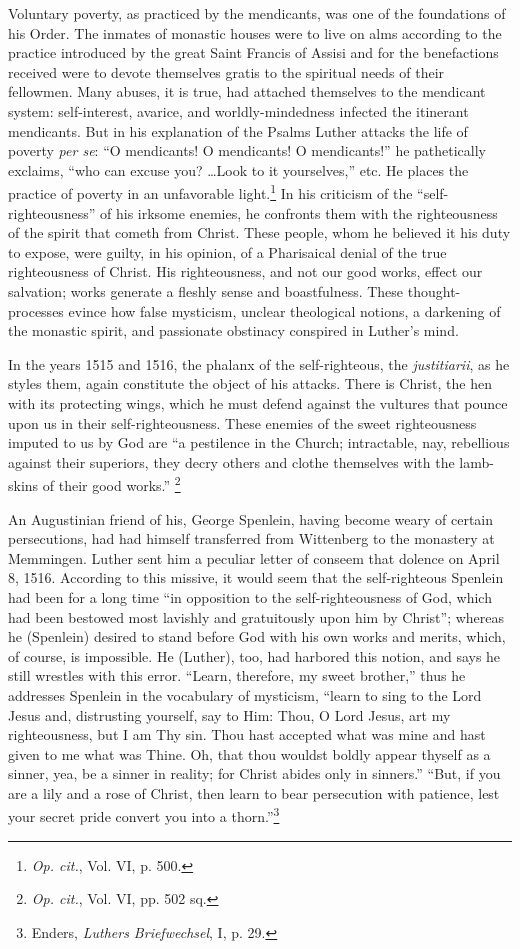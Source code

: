 Voluntary poverty, as practiced by the mendicants, was one of the
foundations of his Order. The inmates of monastic houses were to
live on alms according to the practice introduced by the great Saint
Francis of Assisi and for the benefactions received were to devote
themselves gratis to the spiritual needs of their fellowmen. Many
abuses, it is true, had attached themselves to the mendicant system:
self-interest, avarice, and worldly-mindedness infected the itinerant
mendicants. But in his explanation of the Psalms Luther attacks the
life of poverty \textit{per se}: “O mendicants! O mendicants! O mendicants!”
he pathetically exclaims, “who can excuse you? \dots Look to it
yourselves,” etc. He places the practice of poverty in an unfavorable
light.\footnote{\textit{Op. cit.}, Vol. VI, p. 500.}
In his criticism of the “self-righteousness” of his irksome
enemies, he confronts them with the righteousness of the spirit that
cometh from Christ. These people, whom he believed it his duty to
expose, were guilty, in his opinion, of a Pharisaical denial of the true
righteousness of Christ. His righteousness, and not our good works,
effect our salvation; works generate a fleshly sense and boastfulness.
These thought-processes evince how false mysticism, unclear theological
notions, a darkening of the monastic spirit, and passionate
obstinacy conspired in Luther’s mind.

In the years 1515 and 1516, the phalanx of the self-righteous, the \textit{justitiarii},
as he styles them, again constitute the object of his attacks. There
is Christ, the hen with its protecting wings, which he must defend against
the vultures that pounce upon us in their self-righteousness. These enemies
of the sweet righteousness imputed to us by God are “a pestilence in the
Church; intractable, nay, rebellious against their superiors, they decry others
and clothe themselves with the lamb-skins of their good works.”
\footnote{\textit{Op. cit.}, Vol. VI, pp. 502 sq.}

An Augustinian friend of his, George Spenlein, having become weary
of certain persecutions, had had himself transferred from Wittenberg to
the monastery at Memmingen. Luther sent him a peculiar letter of conseem that
dolence on April 8, 1516. According to this missive, it would seem that
the self-righteous Spenlein had been for a long time ``in opposition to the
self-righteousness of God, which had been bestowed most lavishly and
gratuitously upon him by Christ''; whereas he (Spenlein) desired to stand
before God with his own works and merits, which, of course, is impossible.
He (Luther), too, had harbored this notion, and says he still wrestles with
this error. “Learn, therefore, my sweet brother,” thus he addresses Spenlein
in the vocabulary of mysticism, “learn to sing to the Lord Jesus and, distrusting
yourself, say to Him: Thou, O Lord Jesus, art my righteousness, but
I am Thy sin. Thou hast accepted what was mine and hast given to me what
was Thine. Oh, that thou wouldst boldly appear thyself as a sinner, yea,
be a sinner in reality; for Christ abides only in sinners.” “But, if you are
a lily and a rose of Christ, then learn to bear persecution with patience,
lest your secret pride convert you into a thorn.”\footnote
{Enders, \textit{Luthers Briefwechsel}, I, p. 29.}

